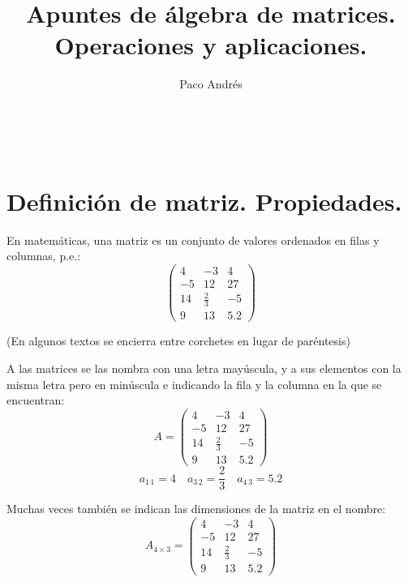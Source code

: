 \documentclass[a4paper,11pt,answers]{exam}
\def \autor{Paco Andrés}
\def \titulo{Apuntes de álgebra de matrices. Operaciones y aplicaciones.}
\begin{document}
\title{\titulo}
\date{}
\author{\autor}
\maketitle

\begin{center}
\doclicenseLongText\\
\vspace{.25cm}
\doclicenseImage
\end{center}
\section{Definición de matriz. Propiedades.}
En matemáticas, una matriz es un conjunto de valores ordenados en filas y columnas, p.e.:
\[\left(\begin{array}{rrr}
4&-3&4\\
-5&12&27\\
14&\frac{2}{3}&-5\\
9&13&5.2
\end{array}\right)\]
\begin{center}
	\begin{small}
		(En algunos textos se encierra entre corchetes en lugar de paréntesis)\\
	\end{small}
\end{center}

A las matrices se las nombra con una letra mayúscula, y a sus elementos con la misma letra pero en minúscula e indicando la fila y la columna en la que se encuentran:
\[A=\left(\begin{array}{rrr}
4&-3&4\\
-5&12&27\\
14&\frac{2}{3}&-5\\
9&13&5.2
\end{array}\right)\]
\[a_{1\,1} = 4\quad a_{3\,2} = \frac{2}{3} \quad a_{4\,3} = 5.2\]

Muchas veces también se indican las dimensiones de la matriz en el nombre:
\[A_{4\times3}=\left(\begin{array}{rrr}
4&-3&4\\
-5&12&27\\
14&\frac{2}{3}&-5\\
9&13&5.2
\end{array}\right)\]
\end{document}
